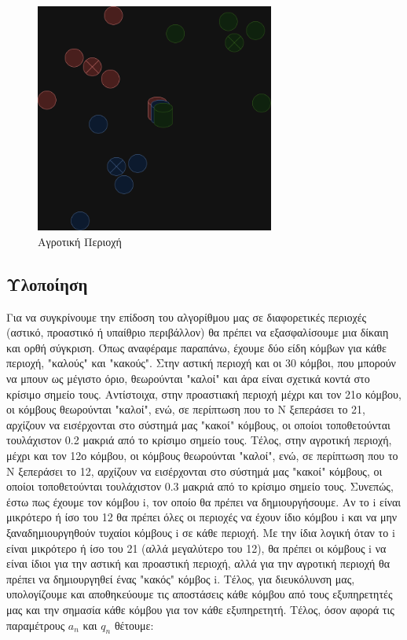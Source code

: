 \begin{figure}[H]
    \centering
    \includegraphics[width=0.7\textwidth]{figures/chapter1/rural.drawio.png}
    \caption{Αγροτική Περιοχή}
    \label{fig49}
\end{figure}

\subsection{Υλοποίηση}

Για να συγκρίνουμε την επίδοση του αλγορίθμου μας σε διαφορετικές περιοχές (αστικό, προαστικό ή υπαίθριο περιβάλλον) θα πρέπει να εξασφαλίσουμε μια δίκαιη και ορθή σύγκριση. Όπως αναφέραμε παραπάνω, έχουμε δύο είδη κόμβων για κάθε περιοχή, "καλούς" και "κακούς". Στην αστική περιοχή και οι 30 κόμβοι, που μπορούν να μπουν ως μέγιστο όριο, θεωρούνται "καλοί" και άρα είναι σχετικά κοντά στο κρίσιμο σημείο τους. Αντίστοιχα, στην προαστιακή περιοχή μέχρι και τον 21ο κόμβου, οι κόμβους θεωρούνται "καλοί", ενώ, σε περίπτωση που το Ν ξεπεράσει το 21, αρχίζουν να εισέρχονται στο σύστημά μας "κακοί" κόμβους, οι οποίοι τοποθετούνται τουλάχιστον 0.2 μακριά από το κρίσιμο σημείο τους. Τέλος, στην αγροτική περιοχή, μέχρι και τον 12ο κόμβου, οι κόμβους θεωρούνται "καλοί", ενώ, σε περίπτωση που το Ν ξεπεράσει το 12, αρχίζουν να εισέρχονται στο σύστημά μας "κακοί" κόμβους, οι οποίοι τοποθετούνται τουλάχιστον 0.3 μακριά από το κρίσιμο σημείο τους. Συνεπώς, έστω πως έχουμε τον κόμβου i, τον οποίο θα πρέπει να δημιουργήσουμε. Αν το i είναι μικρότερο ή ίσο του 12 θα πρέπει όλες οι περιοχές να έχουν ίδιο κόμβου i και να μην ξαναδημιουργηθούν τυχαίοι κόμβους i σε κάθε περιοχή. Με την ίδια λογική όταν το i είναι μικρότερο ή ίσο του 21 (αλλά μεγαλύτερο του 12), θα πρέπει οι κόμβους i να είναι ίδιοι για την αστική και προαστική περιοχή, αλλά για την αγροτική περιοχή θα πρέπει να δημιουργηθεί ένας "κακός" κόμβος i. Τέλος, για διευκόλυνση μας, υπολογίζουμε και αποθηκεύουμε τις αποστάσεις κάθε κόμβου από τους εξυπηρετητές μας και την σημασία κάθε κόμβου για τον κάθε εξυπηρετητή. Τέλος, όσον αφορά τις παραμέτρους $a_n$ και $q_n$ θέτουμε:

